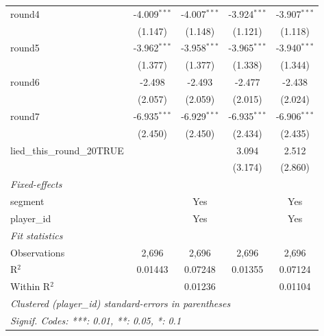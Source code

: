\begin{tabular}{lcccc}
   round4                       & -4.009$^{***}$ & -4.007$^{***}$ & -3.924$^{***}$ & -3.907$^{***}$\\   
                                & (1.147)        & (1.148)        & (1.121)        & (1.118)\\   
   round5                       & -3.962$^{***}$ & -3.958$^{***}$ & -3.965$^{***}$ & -3.940$^{***}$\\   
                                & (1.377)        & (1.377)        & (1.338)        & (1.344)\\   
   round6                       & -2.498         & -2.493         & -2.477         & -2.438\\   
                                & (2.057)        & (2.059)        & (2.015)        & (2.024)\\   
   round7                       & -6.935$^{***}$ & -6.929$^{***}$ & -6.935$^{***}$ & -6.906$^{***}$\\   
                                & (2.450)        & (2.450)        & (2.434)        & (2.435)\\   
   lied\_this\_round\_20TRUE    &                &                & 3.094          & 2.512\\   
                                &                &                & (3.174)        & (2.860)\\   
   \midrule
   \emph{Fixed-effects}\\
   segment                      &                & Yes            &                & Yes\\  
   player\_id                   &                & Yes            &                & Yes\\  
   \midrule
   \emph{Fit statistics}\\
   Observations                 & 2,696          & 2,696          & 2,696          & 2,696\\  
   R$^2$                        & 0.01443        & 0.07248        & 0.01355        & 0.07124\\  
   Within R$^2$                 &                & 0.01236        &                & 0.01104\\  
   \midrule \midrule
   \multicolumn{5}{l}{\emph{Clustered (player\_id) standard-errors in parentheses}}\\
   \multicolumn{5}{l}{\emph{Signif. Codes: ***: 0.01, **: 0.05, *: 0.1}}\\
\end{tabular}
\par\endgroup


